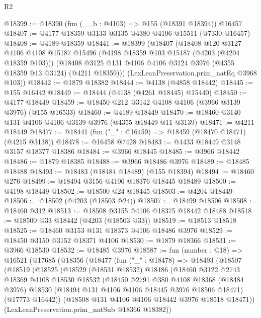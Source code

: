 \begin{lexlean}{R2}
\begin{coremodule}
@18399 := @18390 (fun (__b : @4103) => @155 (@18391 @18394)) @16457
@18407 := @4177 @18359 @3133 @3135 @4380 @4106 @15511 (@7330 @16457)
@18408 := @4189 @18359
@18441 := @18399
    (@18407
      (@18408
        @120
        @3127
        @4106
        @4108
        @15187
        @15496
        (@4198 @18359 @103 @15187 (@4203 (@4204 @18359 @103)))
        (@18408 @3125 @131 @4106 @4106 @3124 @3976 (@4355 @18359 @13 @3124) (@4211 @18359)))
      (LexLeanPreservation.prim_natEq @3968 @103))
@18442 := @1879 @18382
@18444 := @4138 (@4858 @18442)
@18445 := @155 @16442
@18449 := @18444 (@4138 (@4261 @18445) @15440)
@18450 := @4177 @18449
@18459 := @18450 @212 @3142 @4108 @4106 (@3966 @3139 @3976) (@155 @16533)
@18460 := @4189 @18449
@18470 := @18460 @3140 @131 @4106 @4106 @3139 @3976 (@4355 @18449 @11 @3139)
@18471 := @4211 @18449
@18477 := @18441 (fun ("_" : @16459) => @18459 (@18470 @18471) (@4215 @3138))
@18478 := @16458 @7428
@18483 := @4433 @18449 @3148 @3157 @18377 @18386
@18484 := @3966 @18445
@18485 := @3966 @18442
@18486 := @1879 @18385
@18488 := @3966 @18486 @3976
@18489 := @18485 @18488
@18493 := @18483 (@18484 @18489) (@155 @18394)
@18494 := @18460 @276
@18499 := @18494 @3156 @4106 @18376 @18445 @18489
@18500 := @4198 @18449
@18502 := @18500 @24 @18445
@18503 := @4204 @18449
@18506 := @18502 (@4203 (@18503 @24))
@18507 := @18499 @18506
@18508 := @18460 @312
@18513 := @18508 @3155 @4106 @18375 @18442 @18488
@18518 := @18500 @33 @18442 (@4203 (@18503 @33))
@18519 := @18513 @18518
@18525 := @18460 @3153 @131 @18373 @4106 @18486 @3976
@18529 := @18450 @3150 @3152 @18371 @4106
@18530 := @1879 @18366
@18531 := @3966 @18530
@18532 := @18485 @3976
@18587 := fun (number : @18) =>
  @16521
    (@17685
      (@18356
        (@18477
          (fun ("_" : @18478) =>
          @18493
            (@18507
              (@18519
                (@18525
                  (@18529
                    (@18531 @18532)
                    @18486
                    (@18460
                      @3122
                      @2743
                      @18369
                      @4108
                      @18530
                      @18532
                      (@18450
                        @2791
                        @380
                        @4108
                        @18368
                        (@18484 @3976)
                        @18530
                        (@18494 @131 @4106 @4106 @18445 @3976 @18506 @18471)
                        (@17773 @16442))
                      (@18508 @131 @4106 @4106 @18442 @3976 @18518 @18471))
                    (LexLeanPreservation.prim_natSub @18366 @18382))

\end{coremodule}
\end{lexlean}
